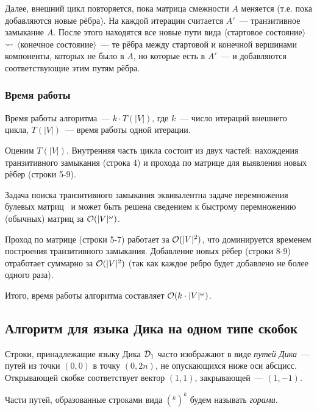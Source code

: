 Далее, внешний цикл повторяется, пока матрица смежности $A$ меняется (т.е. пока добавляются новые рёбра). На каждой итерации считается $A'$~--- транзитивное замыкание $A$. После этого находятся все новые пути вида $\langle$стартовое состояние$\rangle$ $\rightsquigarrow$ $\langle$конечное состояние$\rangle$~--- те рёбра между стартовой и конечной вершинами компоненты, которых не было в $A$, но которые есть в $A'$~--- и добавляются соответствующие этим путям рёбра.

\subsubsection*{Время работы}

Время работы алгоритма~--- $k \cdot T(|V|)$, где $k$~--- число итераций внешнего цикла, $T(|V|)$~--- время работы одной итерации. 

Оценим $T(|V|)$. Внутренняя часть цикла состоит из двух частей: нахождения транзитивного замыкания (строка 4) и прохода по матрице для выявления новых рёбер (строки 5-9). 

Задача поиска транзитивного замыкания эквивалентна задаче перемножения булевых матриц~\cite{Aho1974} и может быть решена сведением к быстрому перемножению (обычных) матриц за $\mathcal{O}(|V|^\omega)$.

Проход по матрице (строки 5-7) работает за $\mathcal{O}(|V|^2)$, что доминируется временем построения транзитивного замыкания. Добавление новых рёбер (строки 8-9) отработает суммарно за $\mathcal{O}(|V|^2)$ (так как каждое ребро будет добавлено не более одного раза).

Итого, время работы алгоритма составляет $\mathcal{O}(k \cdot |V|^{\omega})$.

\subsection{Алгоритм для языка Дика на одном типе скобок}

\begin{definition}\label{def:dyck_paths}
  Строки, принадлежащие языку Дика $\mathcal{D}_1$ часто изображают в виде \textit{путей Дика}~--- путей из точки $(0, 0)$ в точку $(0, 2n)$, не опускающихся ниже оси абсцисс. Открывающей скобке соответствует вектор $(1, 1)$, закрывающей~--- $(1, -1)$.

  Части путей, образованные строками вида $(^k )^k$ будем называть \textit{горами}.

\end{definition}


